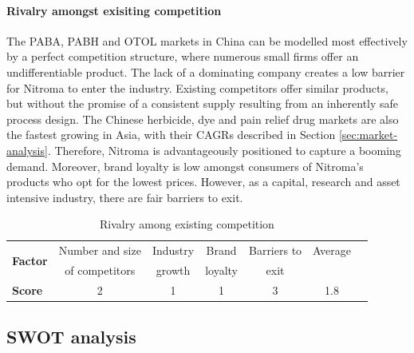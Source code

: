 \paragraph{Rivalry amongst exisiting competition}
The PABA, PABH and OTOL markets in China can be modelled most effectively by a perfect competition structure, where numerous small firms offer an undifferentiable product. The lack of a dominating company creates a low barrier for Nitroma to enter the industry. Existing competitors offer similar products, but without the promise of a consistent supply resulting from an inherently safe process design. The Chinese herbicide, dye and pain relief drug markets are also the fastest growing in Asia, with their CAGRs described in Section \ref{sec:market-analysis}. Therefore, Nitroma is advantageously positioned to capture a booming demand. Moreover, brand loyalty is low amongst consumers of Nitroma’s products who opt for the lowest prices. However, as a capital, research and asset intensive industry, there are fair barriers to exit. 
                                                        
\begin{table}[H]
\centering
\caption{Rivalry among existing competition}
\label{tab:rivalry}
\begin{tabular}{lcccccc}
\toprule
\multirow{2}{*}{\textbf{Factor}} & Number and size       & Industry   & Brand          & Barriers to    & Average   \\
                                 & of competitors        & growth     & loyalty        & exit           &           \\\midrule
\textbf{Score}                   & 2                     & 1          & 1              & 3              & \cellcolor{green}1.8       \\\bottomrule
\end{tabular}%
\end{table}

\subsection{SWOT analysis}

